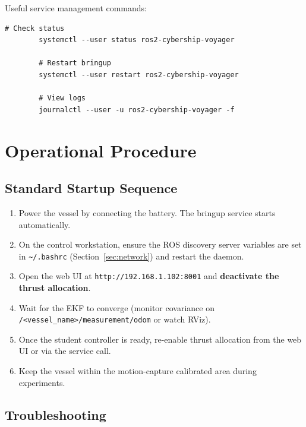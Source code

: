\documentclass[12pt,a4paper]{article}
\begin{document}
	Useful service management commands:
	
	\begin{lstlisting}[style=bash]
		# Check status
		systemctl --user status ros2-cybership-voyager
		
		# Restart bringup
		systemctl --user restart ros2-cybership-voyager
		
		# View logs
		journalctl --user -u ros2-cybership-voyager -f
	\end{lstlisting}
	
	\section{Operational Procedure}
	\label{sec:operations}
	
	\subsection{Standard Startup Sequence}
	
	\begin{enumerate}
		\item Power the vessel by connecting the battery. The bringup service starts automatically.
		\item On the control workstation, ensure the ROS discovery server variables are set in
		\texttt{\textasciitilde/.bashrc} (Section~\ref{sec:network}) and restart the daemon.
		\item Open the web UI at \texttt{http://192.168.1.102:8001} and
		\textbf{deactivate the thrust allocation}.
		\item Wait for the EKF to converge (monitor covariance on
		\texttt{/<vessel\_name>/measurement/odom} or watch RViz).
		\item Once the student controller is ready, re-enable thrust allocation from the web UI or
		via the service call.
		\item Keep the vessel within the motion-capture calibrated area during experiments.
	\end{enumerate}
	
	\subsection{Troubleshooting}
	
\end{document}
